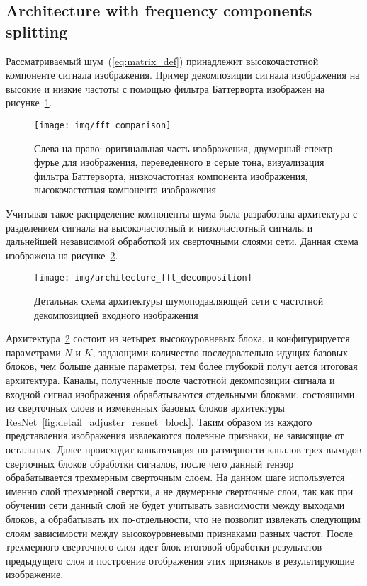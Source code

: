 \documentclass[runningheads]{llncs}
\begin{document}
\subsection{Architecture with frequency components splitting}

Рассматриваемый шум~(\ref{eq:matrix_def}) принадлежит высокочастотной компоненте сигнала изображения. Пример декомпозиции сигнала изображения на высокие и низкие частоты с помощью фильтра Баттерворта изображен на рисунке~\ref{fig:fft_comparison}.

\begin{figure}
	\centering
	\texttt{[image: img/fft\_comparison]}
	\caption{Слева на право: оригинальная часть изображения, двумерный спектр фурье для изображения, переведенного в серые тона, визуализация фильтра Баттерворта, низкочастотная компонента изображения, высокочастотная компонента изображения}
	\label{fig:fft_comparison}
\end{figure}


Учитывая такое распрделение компоненты шума была разработана архитектура с разделением сигнала на высокочастотный и низкочастотный сигналы и дальнейшей независимой обработкой их сверточными слоями сети. Данная схема изображена на рисунке~\ref{fig:architecture_fft_decomposition}.

\begin{figure}
	\centering
	\texttt{[image: img/architecture\_fft\_decomposition]}
	\caption{Детальная схема архитектуры шумоподавляющей сети с частотной декомпозицией входного изображения}
	\label{fig:architecture_fft_decomposition}
\end{figure}

Архитектура~\ref{fig:architecture_fft_decomposition} состоит из четырех высокоуровневых блока, и конфигурируется параметрами $N$ и $K$, задающими количество последовательно идущих базовых блоков, чем больше данные параметры, тем более глубокой получ ается итоговая архитектура. Каналы, полученные после частотной декомпозиции сигнала и входной сигнал изображения обрабатываются отдельными блоками, состоящими из сверточных слоев и измененных базовых блоков архитектуры ResNet~\ref{fig:detail_adjuster_resnet_block}. Таким образом из каждого представления изображения извлекаются полезные признаки, не зависящие от остальных. Далее происходит конкатенация по размерности каналов трех выходов сверточных блоков обработки сигналов, после чего данный тензор обрабатывается трехмерным сверточным слоем. На данном шаге используется именно слой трехмерной свертки, а не двумерные сверточные слои, так как при обучении сети данный слой не будет учитывать зависимости между выходами блоков, а обрабатывать их по-отдельности, что не позволит извлекать следующим слоям зависимости между высокоуровневыми признаками разных частот. После трехмерного сверточного слоя идет блок итоговой обработки результатов предыдущего слоя и построение отображения этих признаков в результирующие изображение. 
\end{document}

